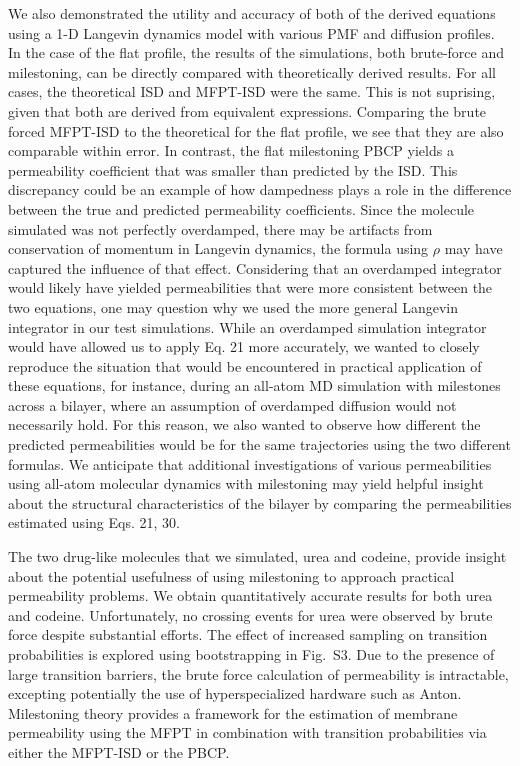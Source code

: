 	\par We also demonstrated the utility and accuracy of both of the derived equations using a 1-D Langevin dynamics model with various  PMF and diffusion profiles. In the case of the flat profile, the results of the simulations, both brute-force and milestoning, can be directly compared with theoretically derived results. For all cases, the theoretical ISD and MFPT-ISD were the same. This is not suprising, given that both are derived from equivalent expressions. Comparing the brute forced MFPT-ISD to the theoretical for the flat profile, we see that they are also comparable within error. In contrast, the flat milestoning PBCP yields a permeability coefficient that was smaller than predicted by the ISD. This discrepancy could be an example of how dampedness plays a role in the difference between the true and predicted permeability coefficients. Since the molecule simulated was not perfectly overdamped, there may be artifacts from conservation of momentum in Langevin dynamics, the formula using $\rho$ may have captured the influence of that effect.  Considering that an overdamped integrator would likely have yielded permeabilities that were more consistent between the two equations, one may question why we used the more general Langevin integrator in our test simulations. While an overdamped simulation integrator would have allowed us to apply Eq. 21 more accurately, we wanted to closely reproduce the situation that would be encountered in practical application of these equations, for instance, during an all-atom MD simulation with milestones across a bilayer, where an assumption of overdamped diffusion would not necessarily hold. For this reason, we also wanted to observe how different the predicted permeabilities would be for the same trajectories using the two different formulas.
	We anticipate that additional investigations of various permeabilities using all-atom molecular dynamics with milestoning may yield helpful insight about the structural characteristics of the bilayer by comparing the permeabilities estimated using Eqs. 21, 30.

	\par The two drug-like molecules that we simulated, urea and codeine, provide insight about the potential usefulness of using milestoning to approach practical permeability problems. We obtain quantitatively accurate results for both urea and codeine. Unfortunately, no crossing events for urea were observed by brute force despite substantial efforts. The effect of increased sampling on transition probabilities is explored using bootstrapping in Fig.~S3. Due to the presence of large transition barriers, the brute force calculation of permeability is intractable, excepting potentially the use of hyperspecialized hardware such as Anton\cite{Shaw2008}. Milestoning theory provides a framework for the estimation of membrane permeability using the MFPT in combination with transition probabilities via either the MFPT-ISD or the PBCP.
\clearpage{}

